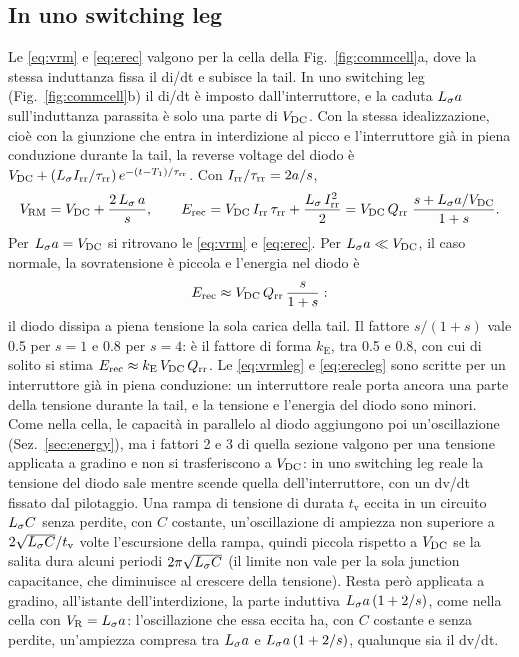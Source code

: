 \documentclass[10pt,a4paper]{scrartcl}
\let\newcommand\pdvaluedefine
\newcommand{\VR}{V_\mathrm{R}}
\newcommand{\Irr}{I_\mathrm{rr}}
\newcommand{\Qrr}{Q_\mathrm{rr}}
\newcommand{\taurr}{\tau_\mathrm{rr}}
\newcommand{\Tone}{T_1}
\newcommand{\Vrm}{V_\mathrm{RM}}
\newcommand{\Ls}{L_\sigma}                    %
\newcommand{\Vdc}{V_\mathrm{DC}}
\newcommand{\Erec}{E_\mathrm{rec}}
\begin{document}
\subsection{In uno switching leg}
\label{sec:switchingleg}
Le \eqref{eq:vrm} e \eqref{eq:erec} valgono per la cella della Fig.~\ref{fig:commcell}a, dove la stessa induttanza fissa il di/dt e subisce la tail. In uno switching leg (Fig.~\ref{fig:commcell}b) il di/dt è imposto dall'interruttore, e la caduta $\Ls a$ sull'induttanza parassita è solo una parte di $\Vdc$. Con la stessa idealizzazione, cioè con la giunzione che entra in interdizione al picco e l'interruttore già in piena conduzione durante la tail, la reverse voltage del diodo è $\Vdc + (\Ls\Irr/\taurr)\,e^{-(t-\Tone)/\taurr}$. Con $\Irr/\taurr = 2a/s$,
\begin{equation}
\Vrm = \Vdc + \frac{2\,\Ls\,a}{s} , \qquad
\Erec = \Vdc\,\Irr\,\taurr + \frac{\Ls\,\Irr^2}{2} = \Vdc\,\Qrr\;\frac{s + \Ls a/\Vdc}{1+s} .
\label{eq:vrmleg}
\end{equation}
Per $\Ls a = \Vdc$ si ritrovano le \eqref{eq:vrm} e \eqref{eq:erec}. Per $\Ls a \ll \Vdc$, il caso normale, la sovratensione è piccola e l'energia nel diodo è
\begin{equation}
\Erec \approx \Vdc\,\Qrr\,\frac{s}{1+s} :
\label{eq:erecleg}
\end{equation}
il diodo dissipa a piena tensione la sola carica della tail. Il fattore $s/(1+s)$ vale \num{0.5} per $s = 1$ e \num{0.8} per $s = 4$: è il fattore di forma $k_\mathrm{E}$, tra \num{0.5} e \num{0.8}, con cui di solito si stima $\Erec \approx k_\mathrm{E}\,\Vdc\,\Qrr$. Le \eqref{eq:vrmleg} e \eqref{eq:erecleg} sono scritte per un interruttore già in piena conduzione: un interruttore reale porta ancora una parte della tensione durante la tail, e la tensione e l'energia del diodo sono minori. Come nella cella, le capacità in parallelo al diodo aggiungono poi un'oscillazione (Sez.~\ref{sec:energy}), ma i fattori 2 e 3 di quella sezione valgono per una tensione applicata a gradino e non si trasferiscono a $\Vdc$: in uno switching leg reale la tensione del diodo sale mentre scende quella dell'interruttore, con un dv/dt fissato dal pilotaggio. Una rampa di tensione di durata $t_\mathrm{v}$ eccita in un circuito $\Ls C$ senza perdite, con $C$ costante, un'oscillazione di ampiezza non superiore a $2\sqrt{\Ls C}/t_\mathrm{v}$ volte l'escursione della rampa, quindi piccola rispetto a $\Vdc$ se la salita dura alcuni periodi $2\pi\sqrt{\Ls C}$ (il limite non vale per la sola junction capacitance, che diminuisce al crescere della tensione). Resta però applicata a gradino, all'istante dell'interdizione, la parte induttiva $\Ls a\,(1+2/s)$, come nella cella con $\VR = \Ls a$: l'oscillazione che essa eccita ha, con $C$ costante e senza perdite, un'ampiezza compresa tra $\Ls a$ e $\Ls a\,(1+2/s)$, qualunque sia il dv/dt.
\end{document}
